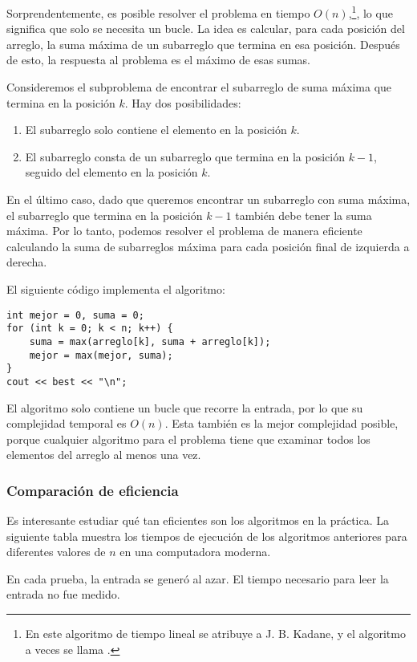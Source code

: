 Sorprendentemente, es posible resolver el problema
en tiempo $O(n)$,\footnote{En \cite{ben86} este algoritmo de tiempo lineal
    se atribuye a J. B. Kadane, y el algoritmo a veces se
    llama .}, lo que significa
que solo se necesita un bucle.
La idea es calcular, para cada posición del arreglo,
la suma máxima de un subarreglo que termina en esa posición.
Después de esto, la respuesta al problema es el
máximo de esas sumas.

Consideremos el subproblema de encontrar el subarreglo de suma máxima
que termina en la posición $k$.
Hay dos posibilidades:
\begin{enumerate}
    \item El subarreglo solo contiene el elemento en la posición $k$.
    \item El subarreglo consta de un subarreglo que termina
          en la posición $k-1$, seguido del elemento en la posición $k$.
\end{enumerate}

En el último caso, dado que queremos
encontrar un subarreglo con suma máxima,
el subarreglo que termina en la posición $k-1$
también debe tener la suma máxima.
Por lo tanto, podemos resolver el problema de manera eficiente
calculando la suma de subarreglos máxima
para cada posición final de izquierda a derecha.

El siguiente código implementa el algoritmo:
\begin{lstlisting}
int mejor = 0, suma = 0;
for (int k = 0; k < n; k++) {
    suma = max(arreglo[k], suma + arreglo[k]);
    mejor = max(mejor, suma);
}
cout << best << "\n";
\end{lstlisting}

El algoritmo solo contiene un bucle
que recorre la entrada,
por lo que su complejidad temporal es $O(n)$.
Esta también es la mejor complejidad posible,
porque cualquier algoritmo para el problema
tiene que examinar todos los elementos del arreglo al menos una vez.

\subsubsection{Comparación de eficiencia}

Es interesante estudiar qué tan eficientes
son los algoritmos en la práctica.
La siguiente tabla muestra los tiempos de ejecución
de los algoritmos anteriores para diferentes
valores de $n$ en una computadora moderna.

En cada prueba, la entrada se generó al azar.
El tiempo necesario para leer la entrada no fue
medido.

